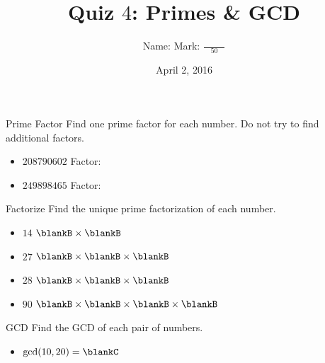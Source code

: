 \documentclass[12pt,letterpaper]{article}
\title{Quiz $4$: Primes \& GCD}
\author{Name: \underline{\hspace{5cm}} Mark: $\displaystyle \frac{\hspace{3em}}{50}$}
\date{April 2, 2016}
\begin{document}
\maketitle

\thispagestyle{empty}

\begin{problem}{Prime Factor}
 Find one prime factor for each number. Do not try to find additional factors.

 \begin{itemize}
  \item $208790602$ \hfill Factor: \blankB
  \item $249898465$ \hfill Factor: \blankB
 \end{itemize}

\end{problem}

\begin{problem}{Factorize}
 Find the unique prime factorization of each number.

 \begin{itemize}
  \item $14$ \hfill $\blankB \times \blankB$
  \item $27$ \hfill $\blankB \times \blankB \times \blankB$
  \item $28$ \hfill $\blankB \times \blankB \times \blankB$
  \item $90$ \hfill $\blankB \times \blankB \times \blankB \times \blankB$
 \end{itemize}
\end{problem}

\begin{problem}{GCD}
 Find the GCD of each pair of numbers.

 \begin{itemize}
  \item $\gcd(10, 20) = \blankC$
 \end{itemize}
\end{problem}
\end{document}
